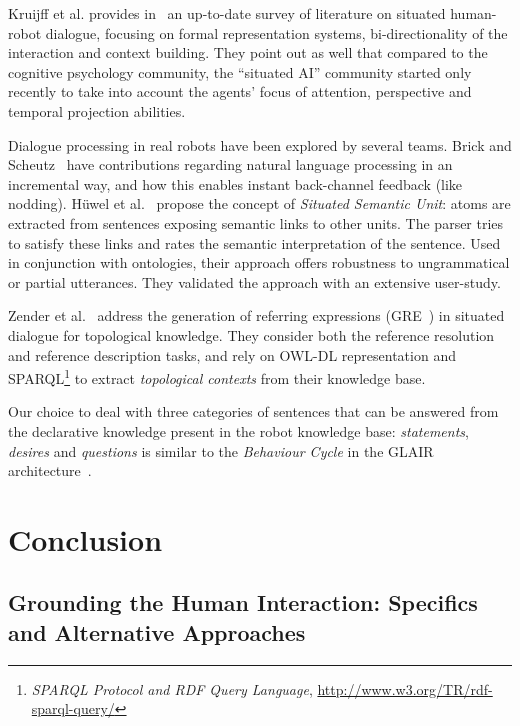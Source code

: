 \documentclass{svmult}
\begin{document}
Kruijff et al. provides in~\cite{Kruijff2010} an up-to-date survey of
literature on situated human-robot dialogue, focusing on formal representation
systems, bi-directionality of the interaction and context building. They point
out as well that compared to the cognitive psychology community, the ``situated
AI'' community started only recently to take into account the agents' focus of
attention, perspective and temporal projection abilities.

Dialogue processing in real robots have been explored by several teams.  Brick
and Scheutz~\cite{Brick2007} have contributions regarding natural language
processing in an incremental way, and how this enables instant back-channel
feedback (like nodding). Hüwel et al.~\cite{Huwel2006} propose the concept of
\textit{Situated Semantic Unit}: atoms are extracted from sentences exposing
semantic links to other units. The parser tries to satisfy these links and
rates the semantic interpretation of the sentence. Used in conjunction with
ontologies, their approach offers robustness to ungrammatical or partial
utterances. They validated the approach with an extensive user-study.

Zender et al.~\cite{Zender2009} address the generation of referring expressions
(GRE~\cite{Dale1995}) in situated dialogue for topological knowledge.  They consider
both the reference resolution and reference description tasks, and rely on
OWL-DL representation and SPARQL\footnote{{\em SPARQL Protocol and RDF Query
Language}, \url{http://www.w3.org/TR/rdf-sparql-query/}} to extract
\emph{topological contexts} from their knowledge base.

Our choice to deal with three categories of sentences that can be answered from
the declarative knowledge present in the robot knowledge base:
\emph{statements}, \emph{desires} and \emph{questions} is similar to the
\emph{Behaviour Cycle} in the GLAIR architecture~\cite{Shapiro2009}.



\section{Conclusion}
\label{conclusion}

\subsection{Grounding the Human Interaction: Specifics and Alternative Approaches}
\label{sec|literature}
\end{document}
